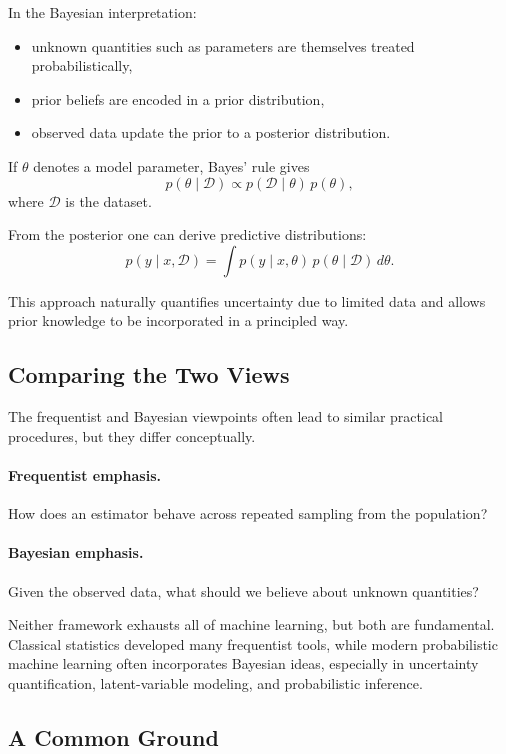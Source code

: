 In the Bayesian interpretation:
\begin{itemize}
    \item unknown quantities such as parameters are themselves treated probabilistically,
    \item prior beliefs are encoded in a prior distribution,
    \item observed data update the prior to a posterior distribution.
\end{itemize}

If $\theta$ denotes a model parameter, Bayes' rule gives
\[
p(\theta\mid \mathcal{D}) \propto p(\mathcal{D}\mid \theta)\,p(\theta),
\]
where $\mathcal{D}$ is the dataset.

From the posterior one can derive predictive distributions:
\[
p(y\mid x,\mathcal{D}) = \int p(y\mid x,\theta)\,p(\theta\mid \mathcal{D})\,d\theta.
\]

This approach naturally quantifies uncertainty due to limited data and allows prior knowledge to be incorporated in a principled way.

\subsection{Comparing the Two Views}

The frequentist and Bayesian viewpoints often lead to similar practical procedures, but they differ conceptually.

\paragraph{Frequentist emphasis.}
How does an estimator behave across repeated sampling from the population?

\paragraph{Bayesian emphasis.}
Given the observed data, what should we believe about unknown quantities?

Neither framework exhausts all of machine learning, but both are fundamental. Classical statistics developed many frequentist tools, while modern probabilistic machine learning often incorporates Bayesian ideas, especially in uncertainty quantification, latent-variable modeling, and probabilistic inference.

\subsection{A Common Ground}

